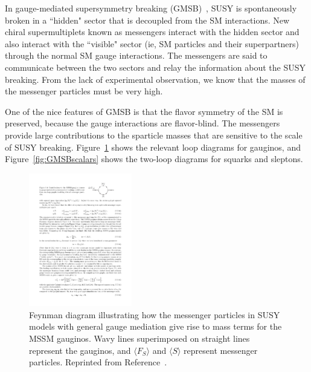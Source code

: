 In gauge-mediated supersymmetry breaking (GMSB)~\cite{Fayet:1977vd, Fayet:1979yb, Fayet:1986zc, Dine:1993yw, Dine:1994vc,                                                   
Dine:1995ag,Meade:2008wd, Buican:2008ws, Abel:2009ve}, SUSY is spontaneously broken in a ``hidden" sector that is decoupled from the SM interactions. 
New chiral supermultiplets known as messengers interact with the hidden sector and 
also interact with the ``visible" sector (ie, SM particles and their superpartners) through the normal
SM gauge interactions. The messengers are said to communicate between the two sectors and relay the information about the SUSY breaking.
From the lack of experimental observation, we know that the masses of the messenger particles must be very high. 

One of the nice features of GMSB is that the flavor symmetry of the SM is preserved, because the gauge interactions are flavor-blind. 
The messengers provide large contributions to the sparticle masses that are sensitive to the scale of SUSY breaking. 
Figure~\ref{fig:GMSBgaugino} shows the relevant loop diagrams for gauginos, and Figure~\ref{fig:GMSBscalars}
shows the two-loop diagrams for squarks and sleptons.

\begin{figure}[htbp]
    \centering
    \includegraphics[width=0.4\textwidth]{Figures/Theory/GMSBgaugino.pdf}
    \caption[Feynman diagram illustrating how the messenger particles in SUSY models
    with general gauge mediation give rise to mass terms for the MSSM gauginos.]
    {Feynman diagram illustrating how the messenger particles in SUSY models
    with general gauge mediation give rise to mass terms for the MSSM gauginos. 
    Wavy lines superimposed on straight lines represent the gauginos, and 
    $\langle F_S \rangle$ and $\langle S \rangle$ represent messenger particles.
    Reprinted from Reference~\cite{SUSYprimer}.}
    \label{fig:GMSBgaugino}
\end{figure}


